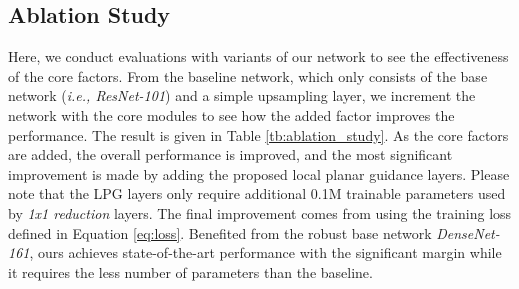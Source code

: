 \documentclass[10pt,twocolumn,letterpaper]{article}
\begin{document}
\begin{table*}[t]
	\centering
	\caption{Experimental results using KITTI's Eigen split with various base netowrks. In this experiment, we set the capturing range to .}
	\label{tb:various_backbones_kitti}	
\end{table*}

\subsection{Ablation Study}
\label{sec:ablation_study}
Here, we conduct evaluations with variants of our network to see the effectiveness of the core factors.
From the baseline network, which only consists of the base network (\textit{i.e., ResNet-101}) and a simple upsampling layer, we increment the network with the core modules to see how the added factor improves the performance.
The result is given in Table \ref{tb:ablation_study}.
As the core factors are added, the overall performance is improved, and the most significant improvement is made by adding the proposed local planar guidance layers.
Please note that the LPG layers only require additional 0.1M trainable parameters used by \textit{1x1 reduction} layers.
The final improvement comes from using the training loss defined in Equation \ref{eq:loss}.
Benefited from the robust base network \textit{DenseNet-161}, ours achieves state-of-the-art performance with the significant margin while it requires the less number of parameters than the baseline.
\end{document}
